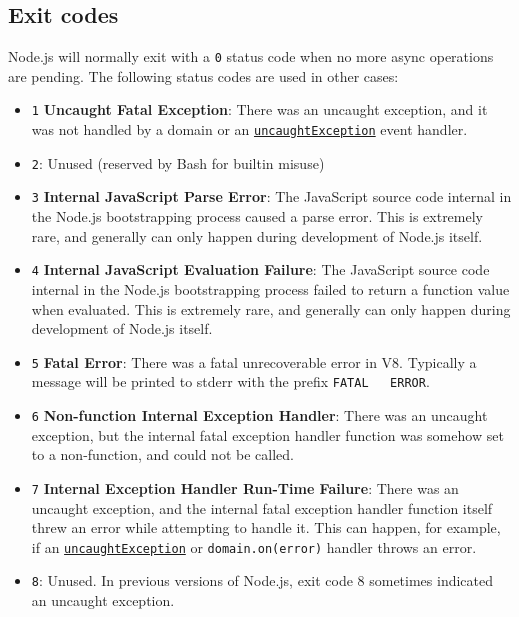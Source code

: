 \subsection{Exit codes}\label{exit-codes}

Node.js will normally exit with a \texttt{0} status code when no more
async operations are pending. The following status codes are used in
other cases:

\begin{itemize}
\tightlist
\item
  \texttt{1} \textbf{Uncaught Fatal Exception}: There was an uncaught
  exception, and it was not handled by a domain or an
  \hyperref[event-uncaughtexception]{\texttt{\textquotesingle{}uncaughtException\textquotesingle{}}}
  event handler.
\item
  \texttt{2}: Unused (reserved by Bash for builtin misuse)
\item
  \texttt{3} \textbf{Internal JavaScript Parse Error}: The JavaScript
  source code internal in the Node.js bootstrapping process caused a
  parse error. This is extremely rare, and generally can only happen
  during development of Node.js itself.
\item
  \texttt{4} \textbf{Internal JavaScript Evaluation Failure}: The
  JavaScript source code internal in the Node.js bootstrapping process
  failed to return a function value when evaluated. This is extremely
  rare, and generally can only happen during development of Node.js
  itself.
\item
  \texttt{5} \textbf{Fatal Error}: There was a fatal unrecoverable error
  in V8. Typically a message will be printed to stderr with the prefix
  \texttt{FATAL\ \ \ ERROR}.
\item
  \texttt{6} \textbf{Non-function Internal Exception Handler}: There was
  an uncaught exception, but the internal fatal exception handler
  function was somehow set to a non-function, and could not be called.
\item
  \texttt{7} \textbf{Internal Exception Handler Run-Time Failure}: There
  was an uncaught exception, and the internal fatal exception handler
  function itself threw an error while attempting to handle it. This can
  happen, for example, if an
  \hyperref[event-uncaughtexception]{\texttt{\textquotesingle{}uncaughtException\textquotesingle{}}}
  or \texttt{domain.on(\textquotesingle{}error\textquotesingle{})}
  handler throws an error.
\item
  \texttt{8}: Unused. In previous versions of Node.js, exit code 8
  sometimes indicated an uncaught exception.

\end{itemize}
